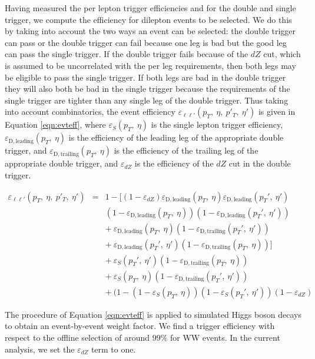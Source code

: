 Having measured the per lepton trigger efficiencies 
and for the double and single trigger,
we compute the efficiency for dilepton events to be selected.
We do this by taking into account the two ways an event can be selected: 
the double trigger can pass or the double trigger can fail because one leg is bad
but the good leg can pass the single trigger.  If the double trigger fails
because of the $dZ$ cut, which is assumed to be uncorrelated with the per leg requirements,
then both legs may be eligible to pass the single trigger. 
If both legs are bad in the double trigger they will also both be bad in the single trigger
because the requirements of the single trigger are tighter than any single leg of the double trigger.
Thus taking into account combinatorics, the event efficiency $\varepsilon_{\ell\ell'}(p_T,\:\eta,\:p'_T,\:\eta')$
is given in Equation \ref{eqn:evteff}, where $\varepsilon_{S}(p_T,\:\eta)$ is the single 
lepton trigger efficiency,
$\varepsilon_{\mathrm{D,leading}}(p_T,\:\eta)$ is the efficiency of the leading leg of the 
appropriate double trigger, and $\varepsilon_{\mathrm{D,trailing}}(p_T,\:\eta)$ is the 
efficiency of the trailing leg of the appropriate double trigger, and $\varepsilon_{dZ}$ is the efficiency
of the $dZ$ cut in the double trigger.

\begin{eqnarray}
\label{eqn:evteff}
\varepsilon_{\ell\ell'}(p_T,\:\eta,\:p'_T,\:\eta') & = & 1 - [(1-\varepsilon_{dZ})\varepsilon_{\mathrm{D,leading}}(p_T,\:\eta)\varepsilon_{\mathrm{D,leading}}(p_T',\:\eta') \\
               &   & (1-\varepsilon_{\mathrm{D,leading}}(p_T,\:\eta))(1-\varepsilon_{\mathrm{D,leading}}(p_T',\:\eta')) \\
               &   & +~\varepsilon_{\mathrm{D,leading}}(p_T,\:\eta)(1-\varepsilon_{\mathrm{D,trailing}}(p_T',\:\eta')) \\
               &   & +~\varepsilon_{\mathrm{D,leading}}(p_T',\:\eta')(1-\varepsilon_{\mathrm{D,trailing}}(p_T,\:\eta))] \\
               &   & +~\varepsilon_{S}(p_T',\:\eta')(1-\varepsilon_{\mathrm{D,trailing}}(p_T,\:\eta)) \nonumber\\
               &   & +~\varepsilon_{S}(p_T,\:\eta)(1-\varepsilon_{\mathrm{D,trailing}}(p_T',\:\eta')) \\
               &   & +~(1-(1-\varepsilon_{S}(p_T,\:\eta))(1-\varepsilon_{S}(p_T',\:\eta'))(1-\varepsilon_{dZ})
\end{eqnarray}

The procedure of Equation \ref{eqn:evteff} is applied to simulated Higgs boson decays to obtain an event-by-event weight factor. We find a 
trigger efficiency with respect to the offline selection of around $99\%$ for WW events.
In the current analysis, we set the $\varepsilon_{dZ}$ term to one.  

